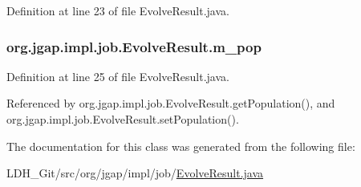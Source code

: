 Definition at line 23 of file Evolve\-Result.\-java.

\hypertarget{classorg_1_1jgap_1_1impl_1_1job_1_1_evolve_result_a8569b061c7ecf7a6c711e825c33a5104}{
\subsubsection[{m\-\_\-pop}]{ org.\-jgap.\-impl.\-job.\-Evolve\-Result.\-m\-\_\-pop\hspace{0.3cm}{\ttfamily [private]}}}\label{classorg_1_1jgap_1_1impl_1_1job_1_1_evolve_result_a8569b061c7ecf7a6c711e825c33a5104}


Definition at line 25 of file Evolve\-Result.\-java.



Referenced by org.\-jgap.\-impl.\-job.\-Evolve\-Result.\-get\-Population(), and org.\-jgap.\-impl.\-job.\-Evolve\-Result.\-set\-Population().



The documentation for this class was generated from the following file\-:\begin{DoxyCompactItemize}
\item 
L\-D\-H\-\_\-\-Git/src/org/jgap/impl/job/\hyperlink{_evolve_result_8java}{Evolve\-Result.\-java}\end{DoxyCompactItemize}
